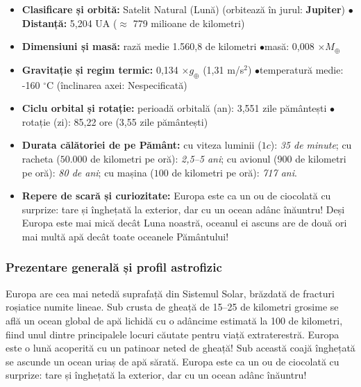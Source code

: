 \begin{tcolorbox}[orbitardata, title={\textbf{Repere esențiale: Europa}}]
\small
\begin{itemize}[leftmargin=1.4em, itemsep=2pt, topsep=2pt]
  \item \textbf{Clasificare și orbită:} Satelit Natural (Lună) (orbitează în jurul: \textbf{Jupiter}) \quad$\bullet$\quad \textbf{Distanță:} 5,204 UA ($\approx$ 779 milioane de kilometri)
  \item \textbf{Dimensiuni și masă:} rază medie 1.560,8 de kilometri \quad$\bullet$\quad masă: 0,008 $\times M_\oplus$
  \item \textbf{Gravitație și regim termic:} 0,134 $\times g_\oplus$ (1,31 m/s$^2$) \quad$\bullet$\quad temperatură medie: -160 $^\circ$C (înclinarea axei: Nespecificată)
  \item \textbf{Ciclu orbital și rotație:} perioadă orbitală (an): 3,551 zile pământești \quad$\bullet$\quad rotație (zi): 85,22 ore (3,55 zile pământești)
  \item \textbf{Durata călătoriei de pe Pământ:} cu viteza luminii ($1c$): \emph{35 de minute}; cu racheta ($50.000$ de kilometri pe oră): \emph{2,5--5 ani}; cu avionul ($900$ de kilometri pe oră): \emph{80 de ani}; cu mașina ($100$ de kilometri pe oră): \emph{717 ani}.
  \item \textbf{Repere de scară și curiozitate:} Europa este ca un ou de ciocolată cu surprize: tare și înghețată la exterior, dar cu un ocean adânc înăuntru! Deși Europa este mai mică decât Luna noastră, oceanul ei ascuns are de două ori mai multă apă decât toate oceanele Pământului!
\end{itemize}
\end{tcolorbox}

\subsubsection*{Prezentare generală și profil astrofizic}
Europa are cea mai netedă suprafață din Sistemul Solar, brăzdată de fracturi roșiatice numite \guillemotleft{}lineae\guillemotright{}. Sub crusta de gheață de 15--25 de kilometri grosime se află un ocean global de apă lichidă cu o adâncime estimată la 100 de kilometri, fiind unul dintre principalele locuri căutate pentru viață extraterestră. Europa este o lună acoperită cu un patinoar neted de gheață! Sub această coajă înghețată se ascunde un ocean uriaș de apă sărată. Europa este ca un ou de ciocolată cu surprize: tare și înghețată la exterior, dar cu un ocean adânc înăuntru!

